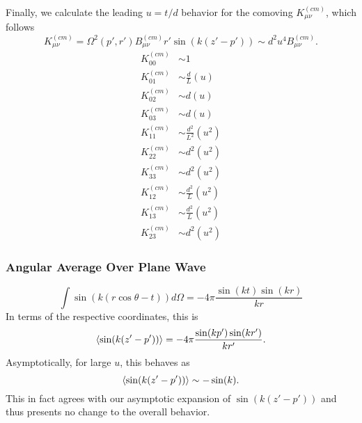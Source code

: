 \documentclass[10pt,letterpaper]{article}
\begin{document}
Finally, we calculate the leading $u= t/d$ behavior for the comoving $K_{\mu\nu}^{(cm)}$, which follows
\begin{equation}
K^{(cm)}_{\mu\nu} = \Omega^2(p',r')  B_{\mu\nu}^{(cm)} r' \sin(k(z'-p')) \sim d^2 u^4 B_{\mu\nu}^{(cm)}.
\end{equation}
\begin{align}
K^{(cm)}_{00} &\sim 1 \nonumber\\
K^{(cm)}_{01} &\sim \frac{d}{L}(u) \nonumber\\
K^{(cm)}_{02} &\sim d (u) \nonumber\\
K^{(cm)}_{03} &\sim d (u) \nonumber\\
K^{(cm)}_{11} &\sim \frac{d^2}{L^2}(u^2) \nonumber\\
K^{(cm)}_{22} &\sim d^2(u^2) \nonumber\\
K^{(cm)}_{33} &\sim d^2(u^2) \nonumber\\
K^{(cm)}_{12} &\sim \frac{d^2}{L}(u^2) \nonumber\\
K^{(cm)}_{13} &\sim \frac{d^2}{L}(u^2) \nonumber\\
K^{(cm)}_{23} &\sim d^2(u^2)
\end{align}
\subsubsection*{Angular Average Over Plane Wave}
\begin{equation}
\int \sin(k(r\cos\theta-t))d\Omega = -4\pi \frac{\sin(kt)\sin(kr)}{kr} 
\end{equation}
In terms of the respective coordinates, this is
\begin{equation}
\braket{\sin(k(z'-p'))} = -4\pi \frac{\sin(kp')\sin(kr')}{kr'}.
\end{equation}
Asymptotically, for large $u$, this behaves as
\begin{equation}
\braket{\sin(k(z'-p'))} \sim -\sin(k).
\end{equation}
This in fact agrees with our asymptotic expansion of $\sin(k(z'-p'))$ and thus presents no change to the overall behavior.
\end{document}
